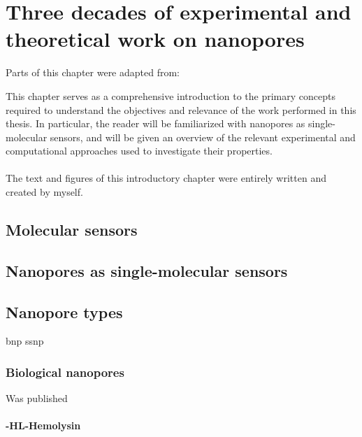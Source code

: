 \chapter{Three decades of experimental and theoretical work on nanopores}\label{ch:introduction}

\begin{shaded}
Parts of this chapter were adapted from:\\
\newpage
\end{shaded}

This chapter serves as a comprehensive introduction to the primary concepts required to understand the objectives and relevance of the work performed in this thesis. In particular, the reader will be familiarized with nanopores as single-molecular sensors, and will be given an overview of the relevant experimental and computational approaches used to investigate their properties.
\\
\\
The text and figures of this introductory chapter were entirely written and created by myself.

\newpage



\section{Molecular sensors}
\section{Nanopores as single-molecular sensors}



\section{Nanopore types}
\gls{bnp}
\gls{ssnp}

\subsection{Biological nanopores}

Was published \cite{Willems-VanMeervelt-2017}

\subsubsection{\textalpha-HL\textalpha-Hemolysin}

